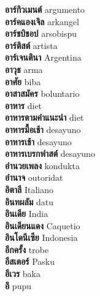 \textbf{ อาร์กิวเมนต์  } argumento \\
\textbf{ อาร์คแองเจิล  } arkangel \\
\textbf{ อาร์ชบิชอป  } arsobispu \\
\textbf{ อาร์ติสต์  } artista \\
\textbf{ อาร์เจนตินา  } Argentina \\
\textbf{ อาวุธ  } arma \\
\textbf{ อาศัย  } biba \\
\textbf{ อาสาสมัคร  } boluntario \\
\textbf{ อาหาร  } diet \\
\textbf{ อาหารตามคำแนะนำ  } diet \\
\textbf{ อาหารมื้อเช้า  } desayuno \\
\textbf{ อาหารเช้า  } desayuno \\
\textbf{ อาหารเบรกฟาสต์  } desayuno \\
\textbf{ อำนวยเพลง  } kondukta \\
\textbf{ อำนาจ  } outoridat \\
\textbf{ อิตาลี  } Italiano \\
\textbf{ อินทผลัม  } datu \\
\textbf{ อินเดีย  } India \\
\textbf{ อินเดียนแดง  } Caquetio \\
\textbf{ อินโดนีเซีย  } Indonesia \\
\textbf{ อีกครั้ง  } trobe \\
\textbf{ อีสเตอร์  } Pasku \\
\textbf{ อีเวร  } baka \\
\textbf{ อึ  } pupu \\
